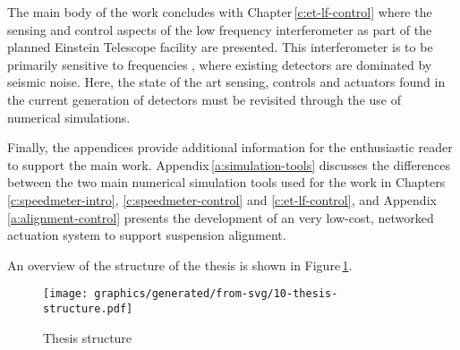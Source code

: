 The main body of the work concludes with Chapter\,\ref{c:et-lf-control} where the sensing and control aspects of the low frequency interferometer as part of the planned Einstein Telescope facility are presented. This interferometer is to be primarily sensitive to frequencies , where existing detectors are dominated by seismic noise. Here, the state of the art sensing, controls and actuators found in the current generation of detectors must be revisited through the use of numerical simulations.

Finally, the appendices provide additional information for the enthusiastic reader to support the main work. Appendix\,\ref{a:simulation-tools} discusses the differences between the two main numerical simulation tools used for the work in Chapters \ref{c:speedmeter-intro}, \ref{c:speedmeter-control} and \ref{c:et-lf-control}, and Appendix\,\ref{a:alignment-control} presents the development of an very low-cost, networked actuation system to support suspension alignment.

An overview of the structure of the thesis is shown in Figure\,\ref{fig:thesis-structure}.

\begin{figure}
  \centering
  \texttt{[image: graphics/generated/from-svg/10-thesis-structure.pdf]}
  \caption{\label{fig:thesis-structure}Thesis structure }
\end{figure}